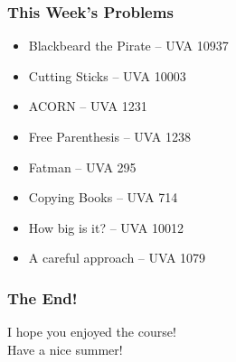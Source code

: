
\begin{frame}
  \frametitle{This Week's Problems}

  \begin{itemize}
  \item Blackbeard the Pirate -- UVA 10937\bigskip

  \item Cutting Sticks -- UVA 10003
  \item ACORN -- UVA 1231\bigskip

  \item Free Parenthesis -- UVA 1238\bigskip

  \item Fatman -- UVA 295
  \item Copying Books -- UVA 714
  \item How big is it? -- UVA 10012\bigskip

  \item A careful approach -- UVA 1079\bigskip
  \end{itemize}

\end{frame}

\begin{frame}
  \frametitle{The End!}

  \begin{center}
    I hope you enjoyed the course!\\
    Have a nice summer!
  \end{center}
\end{frame}
